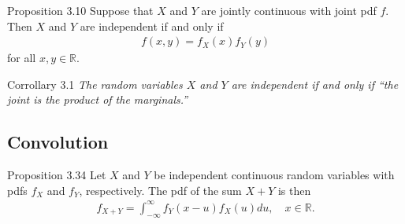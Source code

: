 \begin{boks}{Proposition 3.10}
Suppose that $X$ and $Y$ are jointly continuous with joint pdf $f$. Then $X$ and $Y$ are independent if and only if
\begin{align*}
    f(x, y) = f_X(x)f_Y(y)
\end{align*}
for all $x,y \in \mathbb{R}$.
\end{boks}

\begin{boks}{Corrollary 3.1}
\textit{The random variables $X$ and $Y$ are independent if and only if ``the joint is the product of the marginals.''}
\end{boks}

\subsection{Convolution}
\begin{boks}{Proposition 3.34}
Let $X$ and $Y$ be independent continuous random variables with pdfs $f_X$ and $f_Y$, respectively. The pdf of the sum $X + Y$ is then
\begin{align*}
    f_{X+Y} = \int_{-\infty}^\infty f_Y(x - u)f_X(u)du, \quad x\in \mathbb{R}.
\end{align*}
\end{boks}
